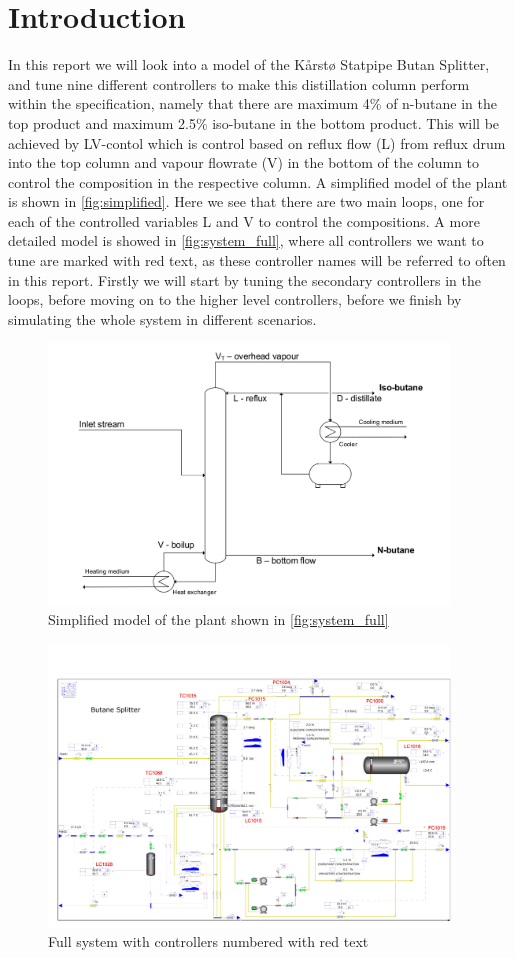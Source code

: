 \chapter{Introduction}\label{ch:intro}
In this report we will look into a model of the Kårstø Statpipe Butan Splitter, and tune nine different controllers to make this distillation column perform within the specification, namely that there are maximum 4\% of n-butane in the top product and maximum 2.5\% iso-butane in the bottom product. This will be achieved by LV-contol which is control based on reflux flow (L) from reflux drum into the top column and vapour flowrate (V) in the bottom of the column to control the composition in the respective column. A simplified model of the plant is shown in \autoref{fig:simplified}. Here we see that there are two main loops, one for each of the controlled variables L and V to control the compositions. A more detailed model is showed in \autoref{fig:system_full}, where all controllers we want to tune are marked with red text, as these controller names will be referred to often in this report. Firstly we will start by tuning the secondary controllers in the loops, before moving on to the higher level controllers, before we finish by simulating the whole system in different scenarios.


\begin{figure}[ht!]
	\centering
	\includegraphics[width=0.95\textwidth]{fig/simplified.png}
	\caption{Simplified model of the plant shown in \autoref{fig:system_full}}
	\label{fig:simplified}
\end{figure}

\begin{figure}[ht!]
	\centering
	\includegraphics[width=0.95\textwidth]{fig/ButaneSplitter-model-detailed_marked_2.pdf}
	\caption{Full system with controllers numbered with red text}
	\label{fig:system_full}
\end{figure}